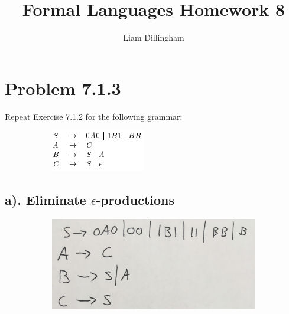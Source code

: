 \documentclass[20pt]{article} %
\title{Formal Languages Homework 8}
\author{Liam Dillingham}
\begin{document}
\maketitle

\section{Problem 7.1.3}
Repeat Exercise 7.1.2 for the following grammar:
\begin{figure}[!htbp]
  	\centering
   	\begin{subfigure}[p]{0.3\linewidth}
    	\includegraphics[width=\linewidth]{./figures/HW8fig1.png}
   	\end{subfigure}
\end{figure} 
\subsection{a). Eliminate $\epsilon$-productions}
\begin{figure}[!htbp]
  	\centering
   	\begin{subfigure}[p]{0.5\linewidth}
    	\includegraphics[width=\linewidth]{./figures/h8-1.jpg}
   	\end{subfigure}
\end{figure}
\end{document}
